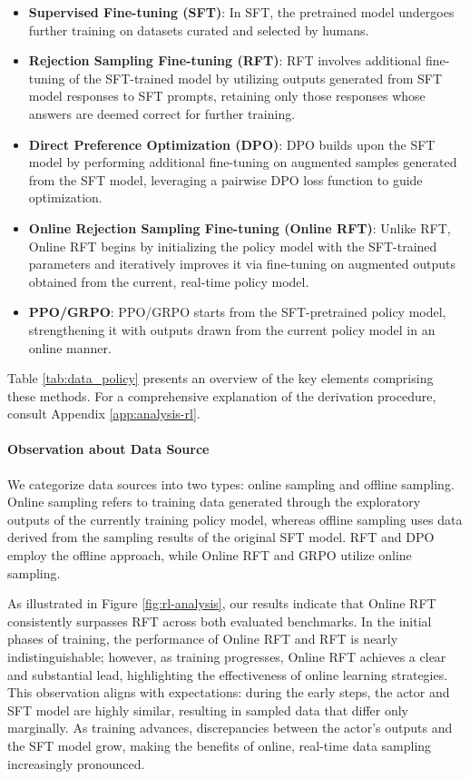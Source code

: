 \begin{itemize}[topsep=0pt]
\begin{itemize}[topsep=0pt]
\begin{itemize}
    \item  \textbf{Supervised Fine-tuning (SFT)}: In SFT, the pretrained model undergoes further training on datasets curated and selected by humans.
    \item \textbf{Rejection Sampling Fine-tuning (RFT)}: RFT involves additional fine-tuning of the SFT-trained model by utilizing outputs generated from SFT model responses to SFT prompts, retaining only those responses whose answers are deemed correct for further training.
    \item \textbf{Direct Preference Optimization (DPO)}: DPO builds upon the SFT model by performing additional fine-tuning on augmented samples generated from the SFT model, leveraging a pairwise DPO loss function to guide optimization.
    \item \textbf{Online Rejection Sampling Fine-tuning (Online RFT)}: Unlike RFT, Online RFT begins by initializing the policy model with the SFT-trained parameters and iteratively improves it via fine-tuning on augmented outputs obtained from the current, real-time policy model.
    \item \textbf{PPO/GRPO}: PPO/GRPO starts from the SFT-pretrained policy model, strengthening it with outputs drawn from the current policy model in an online manner.
\end{itemize}

Table \ref{tab:data_policy} presents an overview of the key elements comprising these methods. For a comprehensive explanation of the derivation procedure, consult Appendix \ref{app:analysis-rl}.

\paragraph{Observation about Data Source} We categorize data sources into two types: online sampling and offline sampling. Online sampling refers to training data generated through the exploratory outputs of the currently training policy model, whereas offline sampling uses data derived from the sampling results of the original SFT model. RFT and DPO employ the offline approach, while Online RFT and GRPO utilize online sampling.

As illustrated in Figure \ref{fig:rl-analysis}, our results indicate that Online RFT consistently surpasses RFT across both evaluated benchmarks. In the initial phases of training, the performance of Online RFT and RFT is nearly indistinguishable; however, as training progresses, Online RFT achieves a clear and substantial lead, highlighting the effectiveness of online learning strategies. This observation aligns with expectations: during the early steps, the actor and SFT model are highly similar, resulting in sampled data that differ only marginally. As training advances, discrepancies between the actor's outputs and the SFT model grow, making the benefits of online, real-time data sampling increasingly pronounced.


\end{itemize}
\end{itemize}
